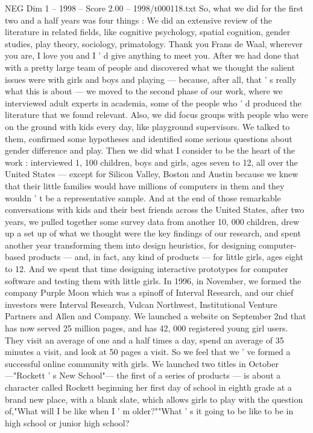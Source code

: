 \begin{textsample}{NEG Dim 1 – 1998 – Score 2.00 – 1998/t000118.txt}
So, what we did for the first two and a half years was four things : We did an extensive review of the literature in related fields, like cognitive psychology, spatial cognition, gender studies, play theory, sociology, primatology.
Thank you Frans de Waal, wherever you are, I love you and I ' d give anything to meet you.
After we had done that with a pretty large team of people and discovered what we thought the salient issues were with girls and boys and playing — because, after all, that ' s really what this is about — we moved to the second phase of our work, where we interviewed adult experts in academia, some of the people who ' d produced the literature that we found relevant.
Also, we did focus groups with people who were on the ground with kids every day, like playground supervisors.
We talked to them, confirmed some hypotheses and identified some serious questions about gender difference and play.
Then we did what I consider to be the heart of the work : interviewed 1, 100 children, boys and girls, ages seven to 12, all over the United States — except for Silicon Valley, Boston and Austin because we knew that their little families would have millions of computers in them and they wouldn ' t be a representative sample.
And at the end of those remarkable conversations with kids and their best friends across the United States, after two years, we pulled together some survey data from another 10, 000 children, drew up a set up of what we thought were the key findings of our research, and spent another year transforming them into design heuristics, for designing computer-based products — and, in fact, any kind of products — for little girls, ages eight to 12.
And we spent that time designing interactive prototypes for computer software and testing them with little girls.
In 1996, in November, we formed the company Purple Moon which was a spinoff of Interval Research, and our chief investors were Interval Research, Vulcan Northwest, Institutional Venture Partners and Allen and Company.
We launched a website on September 2nd that has now served 25 million pages, and has 42, 000 registered young girl users.
They visit an average of one and a half times a day, spend an average of 35 minutes a visit, and look at 50 pages a visit.
So we feel that we ' ve formed a successful online community with girls.
We launched two titles in October —"Rockett ' s New School"— the first of a series of products — is about a character called Rockett beginning her first day of school in eighth grade at a brand new place, with a blank slate, which allows girls to play with the question of,"What will I be like when I ' m older?""What ' s it going to be like to be in high school or junior high school?

\end{textsample}
